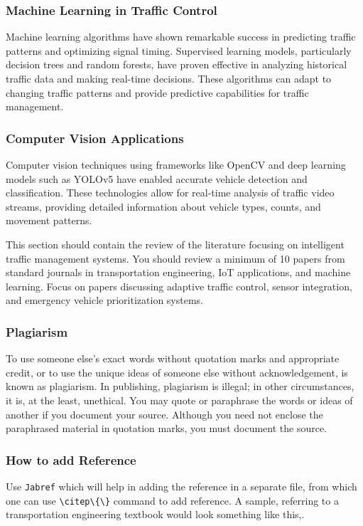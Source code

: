 \documentclass[12pt]{report}
\begin{document}
\subsubsection[Machine Learning in Traffic Control]{\textbf{Machine Learning in Traffic Control}}

Machine learning algorithms have shown remarkable success in predicting traffic patterns and optimizing signal timing. Supervised learning models, particularly decision trees and random forests, have proven effective in analyzing historical traffic data and making real-time decisions. These algorithms can adapt to changing traffic patterns and provide predictive capabilities for traffic management.

\subsubsection{\textbf{Computer Vision Applications}}

Computer vision techniques using frameworks like OpenCV and deep learning models such as YOLOv5 have enabled accurate vehicle detection and classification. These technologies allow for real-time analysis of traffic video streams, providing detailed information about vehicle types, counts, and movement patterns.

This section should contain the review of the literature focusing on intelligent traffic management systems. You should review a minimum of 10 papers from standard journals in transportation engineering, IoT applications, and machine learning. Focus on papers discussing adaptive traffic control, sensor integration, and emergency vehicle prioritization systems.

\subsubsection{\textbf{Plagiarism}}

To use someone else's exact words without quotation marks and appropriate credit, or to use the unique ideas of someone else without acknowledgement, is known as plagiarism. In publishing, plagiarism is illegal; in other circumstances, it is, at the least, unethical. You may quote or paraphrase the words or ideas of another if you document your source. Although you need not enclose the paraphrased material in quotation marks, you must document the source.

\subsubsection{How to add Reference}
Use \texttt{Jabref} which will help in adding the reference in a separate file, from which one can use \verb|\citep\{\}| command to add reference. A sample, referring to a transportation engineering textbook would look something like this,\cite{Transportation2023}.
\end{document}
